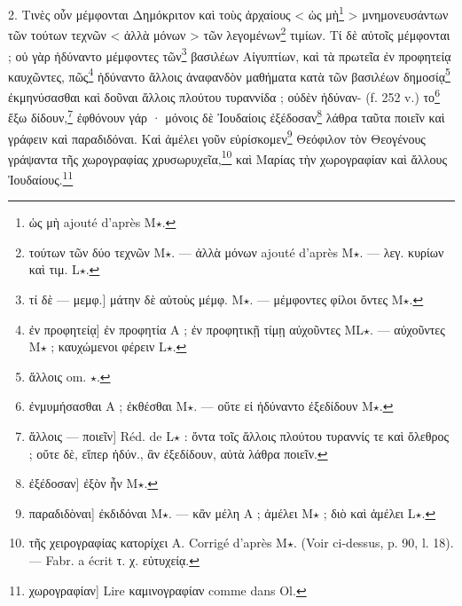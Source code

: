 \documentclass[a4paper, 11pt, oneside, polutonikogreek, french]{article}
\begin{document}
2. Τινὲς οὖν μέμφονται Δημόκριτον καὶ τοὺς ἀρχαίους < ὡς μὴ\footnote{ὡς μὴ ajouté d'après M$\star$.} > μνημονευσάντων τῶν τούτων τεχνῶν < ἀλλὰ μόνων > τῶν λεγομένων\footnote{τούτων τῶν δύο τεχνῶν M$\star$. --- ἀλλὰ μόνων ajouté d'après M$\star$. --- λεγ. κυρίων καὶ τιμ. L$\star$.} τιμίων. Τί δὲ αὐτοῖς μέμφονται ; οὐ γὰρ ἠδύναντο μέμφοντες τῶν\footnote{τί δὲ --- μεμφ.] μάτην δὲ αὐτοὺς μέμφ. M$\star$. --- μέμφοντες φίλοι ὄντες M$\star$.} βασιλέων Αἰγυπτίων, καὶ τὰ πρωτεῖα ἐν προφητείᾳ καυχῶντες, πῶς\footnote{ἐν προφητείᾳ] ἐν προφητία A ; ἐν προφητικῇ τίμῃ αὐχοῦντες ML$\star$. --- αὐχοῦντες M$\star$ ; καυχώμενοι φέρειν L$\star$.} ἠδύναντο ἄλλοις ἀναφανδὸν μαθήματα κατὰ τῶν βασιλέων δημοσίᾳ\footnote{ἄλλοις om. $\star$.} ἐκμηνύσασθαι καὶ δοῦναι ἄλλοις πλούτου τυραννίδα ; οὐδὲν ἠδύναν- (f. 252 v.) το\footnote{ἐνμυμήσασθαι A ; ἐκθέσθαι M$\star$. --- οὔτε εἰ ἠδύναντο ἐξεδίδουν M$\star$.} ἔξω δίδουν,\footnote{ἄλλοις --- ποιεῖν] Réd. de L$\star$ : ὄντα τοῖς ἄλλοις πλούτου τυραννίς τε καὶ ὄλεθρος ; οὔτε δὲ, εἴπερ ἠδύν., ἂν ἐξεδίδουν, αὐτὰ λάθρα ποιεῖν.} ἐφθόνουν γάρ · μόνοις δὲ Ἰουδαίοις ἐξέδοσαν\footnote{ἐξέδοσαν] ἐξὸν ἦν M$\star$.} λάθρα ταῦτα ποιεῖν καὶ γράφειν καὶ παραδιδόναι. Καὶ ἀμέλει γοῦν εὑρίσκομεν\footnote{παραδιδὸναι] ἐκδιδόναι M$\star$. --- κἂν μέλη A ; ἀμέλει M$\star$ ; διὸ καὶ ἀμέλει L$\star$.} Θεόφιλον τὸν Θεογένους γράψαντα τῆς χωρογραφίας χρυσωρυχεῖα,\footnote{τῆς χειρογραφίας κατορίχει A. Corrigé d'après M$\star$. (Voir ci-dessus, p. 90, l. 18). --- Fabr. a écrit τ. χ. εὐτυχείᾳ.} καὶ Μαρίας τὴν χωρογραφίαν καὶ ἄλλους Ἰουδαίους.\footnote{χωρογραφίαν] Lire καμινογραφίαν comme dans Ol.}
\end{document}
